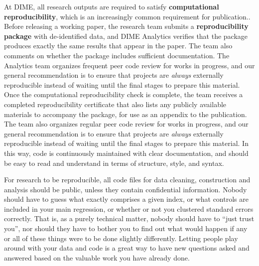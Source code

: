 At DIME, all research outputs are required to satisfy \textbf{computational reproducibility},
which is an increasingly common requirement for publication..
Before releasing a working paper,
the research team submits a \textbf{reproducibility package} with de-identified data,
and DIME Analytics verifies that the package produces
exactly the same results that appear in the paper.
The team also comments on whether the package includes sufficient documentation.
The Analytics team organizes frequent peer code review for works in progress,
and our general recommendation is to ensure that projects
are \textit{always} externally reproducible
instead of waiting until the final stages to prepare this material.
Once the computational reproducibility check is complete,
the team receives a completed reproducibility certificate
that also lists any publicly available materials to accompany the package,
for use as an appendix to the publication.
The team also organizes regular peer code review for works in progress,
and our general recommendation is to ensure that projects
are \textit{always} externally reproducible
instead of waiting until the final stages to prepare this material.
In this way, code is continuously maintained with clear documentation,
and should be easy to read and understand in terms of structure, style, and syntax.

For research to be reproducible,
all code files for data cleaning, construction and analysis
should be public, unless they contain confidential information.
Nobody should have to guess what exactly comprises a given index,
or what controls are included in your main regression,
or whether or not you clustered standard errors correctly.
That is, as a purely technical matter, nobody should have to ``just trust you'',
nor should they have to bother you to find out what would happen
if any or all of these things were to be done slightly differently.
Letting people play around with your data and code
is a great way to have new questions asked and answered
based on the valuable work you have already done.

